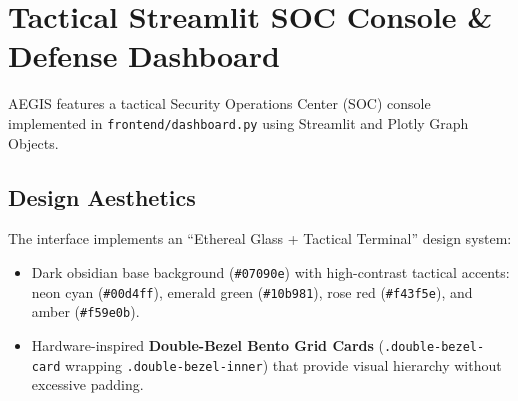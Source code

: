 \section{Tactical Streamlit SOC Console \& Defense Dashboard}
AEGIS features a tactical Security Operations Center (SOC) console implemented in \texttt{frontend/dashboard.py} using Streamlit and Plotly Graph Objects.

\subsection{Design Aesthetics}
The interface implements an ``Ethereal Glass + Tactical Terminal'' design system:
\begin{itemize}
    \item Dark obsidian base background (\texttt{\#07090e}) with high-contrast tactical accents: neon cyan (\texttt{\#00d4ff}), emerald green (\texttt{\#10b981}), rose red (\texttt{\#f43f5e}), and amber (\texttt{\#f59e0b}).
    \item Hardware-inspired \textbf{Double-Bezel Bento Grid Cards} (\texttt{.double-bezel-card} wrapping \texttt{.double-bezel-inner}) that provide visual hierarchy without excessive padding.
\end{itemize}

